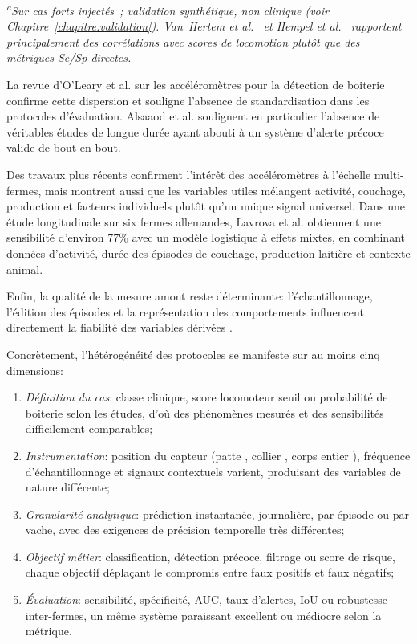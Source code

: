 \vspace{-0.5em}
\noindent\textit{\textsuperscript{a}Sur cas forts injectés~; validation synthétique, non
clinique (voir Chapitre~\ref{chapitre:validation}).
Van~Hertem et al.~\citep{vanhertem2013lameness} et Hempel et al.~\citep{hempel2019dairy}
rapportent principalement des corrélations avec scores de locomotion plutôt que des
métriques Se/Sp directes.}

La revue d'O'Leary et al. \citep{oleary2020accelerometers} sur les accéléromètres pour la
détection de boiterie confirme cette dispersion et souligne l'absence de standardisation
dans les protocoles d'évaluation.
Alsaaod et al. \citep{alsaaod2019automatic} soulignent en particulier l'absence
de véritables études de longue durée ayant abouti à un système d'alerte précoce valide de
bout en bout.

Des travaux plus récents confirment l'intérêt des accéléromètres à l'échelle multi-fermes,
mais montrent aussi que les variables utiles mélangent activité, couchage, production et
facteurs individuels plutôt qu'un unique signal universel. Dans une étude longitudinale sur
six fermes allemandes, Lavrova et al. \citep{lavrova2023lameness} obtiennent une sensibilité
d'environ 77\% avec un modèle logistique à effets mixtes, en combinant données d'activité,
durée des épisodes de couchage, production laitière et contexte animal.

Enfin, la qualité de la mesure amont reste déterminante: l'échantillonnage, l'édition des
épisodes et la représentation des comportements influencent directement la fiabilité des
variables dérivées \citep{ledgerwood2010lying,balasso2023behaviour}.

Concrètement, l'hétérogénéité des protocoles se manifeste sur au moins cinq dimensions:
\begin{enumerate}
    \item \textit{Définition du cas}: classe clinique, score locomoteur seuil ou probabilité
    de boiterie selon les études, d'où des phénomènes mesurés et des sensibilités
    difficilement comparables;
    \item \textit{Instrumentation}: position du capteur (patte
    \citep{alsaaod2012electronic,thorup2015lameness}, collier \citep{blackie2011automatic},
    corps entier \citep{viazzi2013analysis}), fréquence d'échantillonnage et signaux
    contextuels varient, produisant des variables de nature différente;
    \item \textit{Granularité analytique}: prédiction instantanée, journalière, par épisode
    ou par vache, avec des exigences de précision temporelle très différentes;
    \item \textit{Objectif métier}: classification, détection précoce, filtrage ou score de
    risque, chaque objectif déplaçant le compromis entre faux positifs et faux négatifs;
    \item \textit{Évaluation}: sensibilité, spécificité, AUC, taux d'alertes, IoU ou
    robustesse inter-fermes, un même système paraissant excellent ou médiocre selon la
    métrique.
\end{enumerate}

